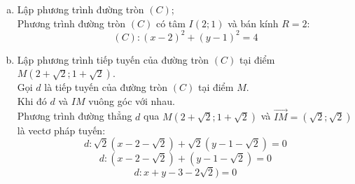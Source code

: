 \begin{bt}
{\begin{enumerate}[a)]
\[{\begin{array}{*{20}{c}}
		  {x =  - 1 + 3t} \\
		  {y = 1 + 2t}
		\end{array}} \right.\]
		$(t \in \mathbb{R})$.
		\item Lập phương trình đường tròn $(C)$;\\
		Phương trình đường tròn $(C)$ có tâm $I(2;1)$ và bán kính $R=2$:
				\[(C): (x-2)^2+(y-1)^2=4\]
		\item Lập phương trình tiếp tuyến của đường tròn $(C)$ tại điểm $M(2+\sqrt{2} ; 1+\sqrt{2})$.\\
		Gọi $d$ là tiếp tuyến của đường tròn $(C)$ tại điểm $M$. \\
		Khi đó $d$ và $IM$ vuông góc với nhau.\\
		Phương trình đường thẳng $d$ qua $M(2+\sqrt{2} ; 1+\sqrt{2})$ và $\overrightarrow{IM}=(\sqrt{2} ; \sqrt{2})$ là vectơ pháp tuyến:\\
		\[d: \sqrt{2}(x-2-\sqrt{2})+\sqrt{2}(y-1-\sqrt{2})=0\]
		\[d: (x-2-\sqrt{2})+(y-1-\sqrt{2})=0\]
		\[d: x+y-3-2\sqrt{2})=0\]
		\end{enumerate}
}
\end{bt}

